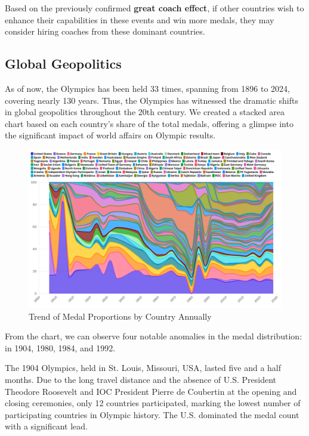 \documentclass[12pt]{article}  %
\begin{document}
Based on the previously confirmed \textbf{great coach effect}, if other countries wish to enhance their capabilities in these events and win more medals, they may consider hiring coaches from these dominant countries.



\subsection{Global Geopolitics}
As of now, the Olympics has been held 33 times, spanning from 1896 to 2024, covering nearly 130 years. Thus, the Olympics has witnessed the dramatic shifts in global geopolitics throughout the 20th century. We created a stacked area chart based on each country's share of the total medals, offering a glimpse into the significant impact of world affairs on Olympic results.

\begin{figure}[H]
	\centering
	\includegraphics[width=16cm]{img/3.3-1.png}
	\caption{Trend of Medal Proportions by Country Annually}
	\label{fig:aa}
\end{figure}

From the chart, we can observe four notable anomalies in the medal distribution: in 1904, 1980, 1984, and 1992.

The 1904 Olympics, held in St. Louis, Missouri, USA, lasted five and a half months. Due to the long travel distance and the absence of U.S. President Theodore Roosevelt and IOC President Pierre de Coubertin at the opening and closing ceremonies, only 12 countries participated, marking the lowest number of participating countries in Olympic history. The U.S. dominated the medal count with a significant lead.
\end{document}
